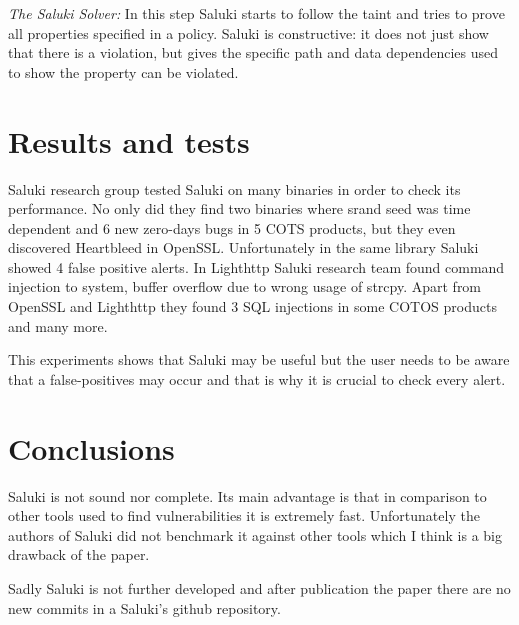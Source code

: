 \documentclass[a4paper, 12pt, journal, onecolumn]{IEEEtran}
\begin{document}
\bigskip
\textit{The Saluki Solver:} In this step Saluki starts to follow the taint and tries to prove all properties specified in a policy. Saluki is constructive: it does not just show that there is a violation, but gives the specific path and data dependencies used to show the property can be violated.



\section{Results and tests}

Saluki research group tested Saluki on many binaries in order to check its performance. No only did they find two binaries where srand seed was time dependent and 6 new zero-days bugs in 5 COTS products, but they even discovered Heartbleed in OpenSSL. Unfortunately in the same library Saluki showed 4 false positive alerts.
In Lighthttp Saluki research team found command injection to system, buffer overflow due to wrong usage of strcpy. Apart from OpenSSL and Lighthttp they found 3 SQL injections in some COTOS products and many more.


This experiments shows that Saluki may be useful but the user needs to be aware that a false-positives may occur and that is why it is crucial to check every alert. 


\section{Conclusions}

Saluki is not sound nor complete. Its main advantage is that in comparison to other tools used to find vulnerabilities it is extremely fast. Unfortunately the authors of Saluki did not benchmark it against other tools which I think is a big drawback of the paper. 

Sadly Saluki is not further developed and after publication the paper \cite{saluki} there are no new commits in a Saluki's github repository. 

\newpage



\end{document}

